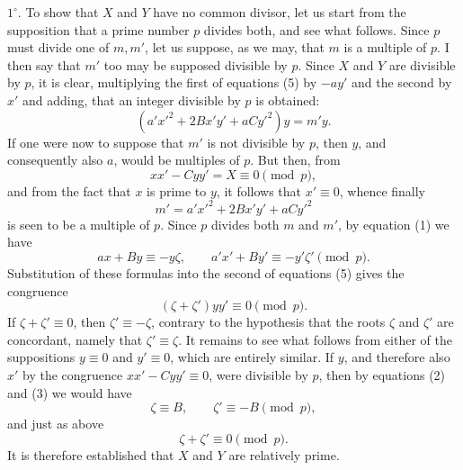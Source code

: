 \documentclass[11pt]{article}
\begin{document}
$1^\circ$. To show that $X$ and $Y$ have no common divisor, let us start from the supposition that a prime number $p$ divides both, and see what follows. Since $p$ must divide one of $m,m'$, let us suppose, as we may, that $m$ is a multiple of $p$. I then say that $m'$ too may be supposed divisible by $p$. Since $X$ and $Y$ are divisible by $p$, it is clear, multiplying the first of equations (5) by $-ay'$ and the second by $x'$ and adding, that an integer divisible by $p$ is obtained:
\[
 (a'x'^2+2Bx'y'+aCy'^2)y=m'y.
\]
If one were now to suppose that $m'$ is not divisible by $p$, then $y$, and consequently also $a$, would be multiples of $p$. But then, from
\[
 xx'-Cyy'=X\equiv0\pmod p,
\]
and from the fact that $x$ is prime to $y$, it follows that $x'\equiv0$, whence finally
\[
 m'=a'x'^2+2Bx'y'+aCy'^2
\]
is seen to be a multiple of $p$. Since $p$ divides both $m$ and $m'$, by equation (1) we have
\[
 ax+By\equiv -y\zeta,
 \qquad
 a'x'+By'\equiv -y'\zeta'\pmod p.
\]
Substitution of these formulas into the second of equations (5) gives the congruence
\[
 (\zeta+\zeta')yy'\equiv0\pmod p.
\]
If $\zeta+\zeta'\equiv0$, then $\zeta'\equiv-\zeta$, contrary to the hypothesis that the roots $\zeta$ and $\zeta'$ are concordant, namely that $\zeta'\equiv\zeta$. It remains to see what follows from either of the suppositions $y\equiv0$ and $y'\equiv0$, which are entirely similar. If $y$, and therefore also $x'$ by the congruence $xx'-Cyy'\equiv0$, were divisible by $p$, then by equations (2) and (3) we would have
\[
 \zeta\equiv B,
 \qquad
 \zeta'\equiv -B\pmod p,
\]
and just as above
\[
 \zeta+\zeta'\equiv0\pmod p.
\]
It is therefore established that $X$ and $Y$ are relatively prime.
\end{document}
